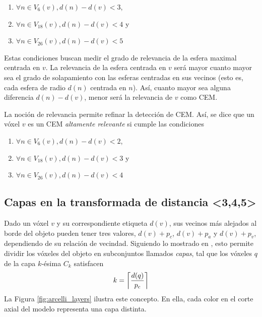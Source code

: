 \begin{enumerate}
\item $\forall n \in V_6(v), d(n) - d(v) < 3$,
\item $\forall n \in V_{18}(v), d(n) - d(v) < 4$ y
\item $\forall n \in V_{26}(v), d(n) - d(v) < 5$
\end{enumerate}

Estas condiciones buscan medir el grado de relevancia de la esfera maximal centrada en $v$. La relevancia de la esfera centrada en $v$ será mayor cuanto mayor sea el grado de solapamiento con las esferas centradas en sus vecinos (esto es, cada esfera de radio $d(n)$ centrada en $n$). Así, cuanto mayor sea alguna diferencia $d(n) - d(v)$, menor será la relevancia de $v$ como CEM.

La noción de relevancia permite refinar la detección de CEM. Así, se dice que un vóxel $v$ es un CEM \textit{altamente relevante} si cumple las condiciones

\begin{enumerate}
\item $\forall n \in V_6(v), d(n) - d(v) < 2$,
\item $\forall n \in V_{18}(v), d(n) - d(v) < 3$ y
\item $\forall n \in V_{26}(v), d(n) - d(v) < 4$
\end{enumerate}

\subsection{Capas en la transformada de distancia <3,4,5>}

Dado un vóxel $v$ y su correspondiente etiqueta $d(v)$, sus vecinos más alejados al borde del objeto pueden tener tres valores, $d(v) + p_c$, $d(v) + p_a$ y $d(v) + p_v$, dependiendo de su relación de vecindad. Siguiendo lo mostrado en \cite{svensson2002using}, esto permite dividir los vóxeles del objeto en subconjuntos llamados \textit{capas}, tal que los vóxeles $q$ de la capa $k$-ésima $C_k$ satisfacen
\DeclarePairedDelimiter{\ceil}{\lceil}{\rceil}
\begin{equation}
k = \ceil[\bigg]{\frac{d(q)}{p_c}}
\end{equation}
La Figura \ref{fig:arcelli_layers} ilustra este concepto. En ella, cada color en el corte axial del modelo representa una capa distinta.

